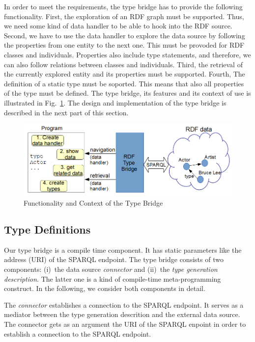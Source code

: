 \documentclass{llncs} %
\begin{document}
In order to meet the requirements, the type bridge has to provide the following functionality.
First, the exploration of an RDF graph must be supported. Thus, we need some kind of data handler
to be able to hook into the RDF source. Second, we have to use the data handler to explore the data source by
following the properties from one entity to the next one. This must be provoded for RDF classes and individuals.
Properties also include type statements, and therefore,
we can also follow relations between classes and individuals.
Third, the retrieval of the currently explored entity and its properties must be supported.
Fourth, The definition of a static type must be soported. This means that also all properties of
the type must be defined.
The type bridge, its features and its context of use is illustrated in Fig.~\ref{fig:context}.
The design and implementation of the type bridge is described in the next part of this section.

\begin{figure}
	\centering
		\includegraphics[width=0.98\linewidth]{./figs/context.png}
	\caption{Functionality and Context of the Type Bridge}
	\label{fig:context}
\end{figure}



\subsection{Type Definitions}

Our type bridge is a compile time component. It has static parameters like
the address (URI) of the SPARQL endpoint.
The type bridge consists of two components: (i)~the data source \emph{connector} and (ii)~the
\emph{type generation description}. The latter one is a kind of compile-time meta-programming construct.
In the following, we consider both components in detail.

The \emph{connector} establishes a connection to the SPARQL endpoint. It serves as a mediator
between the type generation descrition and the external data source.
The connector gets as an argument the URI of the SPARQL enpoint
in order to establish a connection to the SPARQL endpoint.
\end{document}
